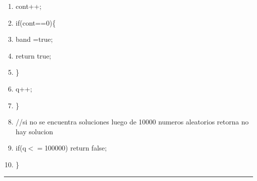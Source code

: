 \documentclass[11pt, conference]{IEEEtran}
\begin{document}
\begin{enumerate}
	\item \qquad\qquad\qquad\qquad cont++;
	\item \qquad\qquad if(cont==0)\{
	\item \qquad\qquad\qquad band =true;
	\item \qquad\qquad\qquad return true;
	\item \qquad\qquad\}
	\item \qquad q++;
	\item \qquad\}
	\item \qquad //si no se encuentra soluciones luego de 10000 numeros aleatorios retorna no hay solucion
	\item \qquad if(q$<=$100000) return false;
	\item \}
\end{enumerate}
\rule[3mm]{181mm}{0.1mm}\\
\end{document}
